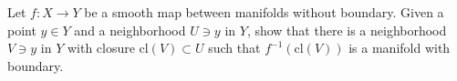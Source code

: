 Let $f:X\rightarrow Y$ be a smooth map between manifolds without
boundary. Given a point $y\in Y$ and a neighborhood $U\ni y$ in $Y$,
show that there is a neighborhood $V\ni y$ in $Y$ with closure
$\text{cl}(V)\subset U $ such that $f^{-1}(\text{cl}(V))$ is a
manifold with boundary.

